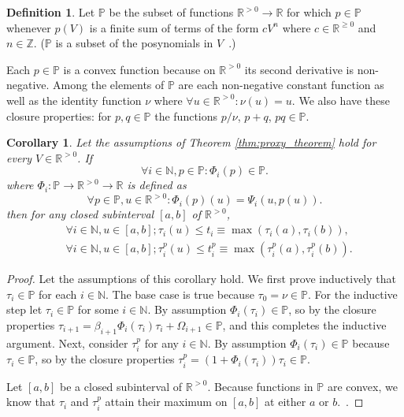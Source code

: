 \documentclass[10pt]{article}
\newtheorem{cor}[thm]{Corollary}
\theoremstyle{definition}
\newtheorem{defn}[thm]{Definition}
\theoremstyle{remark}
\numberwithin{equation}{section}
\newcommand{\ints}{\mathbb{Z}}
\newcommand{\nats}{\mathbb{N}}
\newcommand{\reals}{\mathbb{R}}
\newcommand{\nnreals}{\mathbb{R}^{\ge0}}
\newcommand{\preals}{\mathbb{R}^{>0}}
\newcommand{\pee}{\mathbb{P}}
\begin{document}
\begin{defn}
Let $\pee$ be the subset of functions $\preals \rightarrow \reals$ for which
$p \in \pee$ whenever $p(V)$ is a finite sum of terms of the form $c V^n$ where $c \in \nnreals$ and $n \in \ints$. ($\pee$ is a subset of the posynomials in $V$~\cite{boyd2004convex, dufin1967geometric}.)
\end{defn}

Each $p \in \pee$ is a convex function because on $\preals$ its second derivative is non-negative. Among the elements of $\pee$ are each non-negative constant function as well as the identity function $\nu$ where $\forall u \in \preals: \nu(u) = u$. We also have these closure properties: for $p, q \in\pee$ the functions $p / \nu$, $p+q$, $p q \in \pee$.

\begin{cor} \label{cor:proxy_max}
	Let the assumptions of Theorem \ref{thm:proxy_theorem} hold for every $V \in \preals$.
	If 
	\[
	\forall i \in \nats, p \in \pee: \Phi_i(p) \in \pee .
	\]
	where $\Phi_i: \pee\rightarrow\preals\rightarrow\reals$ is defined as 
	\[
	\forall p \in \pee,u \in \preals: \Phi_i(p)(u) = \Psi_i(u,p(u)) .
	\]
	then for any closed subinterval $[a,b]$ of $\preals$,
	\begin{align*}
	&\forall i \in \nats, u \in [a,b]; \tau_i(u) \le t_i \equiv \max{(\tau_i(a),\tau_i(b))},  \\
	&\forall i \in \nats, u \in [a,b]; \tau_i^p(u) \le t^p_i \equiv \max{(\tau_i^p(a),\tau_i^p(b))} .
	\end{align*}
\end{cor}
\begin{proof}
	Let the assumptions of this corollary hold.
	We first prove inductively that $\tau_i \in \pee$ for each $i \in \nats$. 
	The base case is true because $\tau_0 = \nu \in \pee$. For the inductive step let $\tau_i \in \pee$ for some $i \in \nats$. By assumption $\Phi_i(\tau_i) \in \pee$, so by the closure properties $\tau_{i+1} = \beta_{i+1}\Phi_i(\tau_i)\tau_i + \Omega_{i+1} \in \pee$, and this completes the inductive argument. 
	Next, consider $\tau_i^p$ for any $i \in \nats$. 
	By assumption $\Phi_i(\tau_i) \in \pee$ because $\tau_i \in \pee$, so by the closure properties $\tau_i^p = (1+\Phi_i(\tau_i)) \tau_i \in \pee$.
	
	Let $[a,b]$ be a closed subinterval of $\preals$. 
	Because functions in $\pee$ are convex, we know that $\tau_i$ and $\tau_i^p$ attain their maximum on $[a,b]$ at either $a$ or $b$.~\cite{niculescu2006convex}.
\end{proof}
\end{document}
